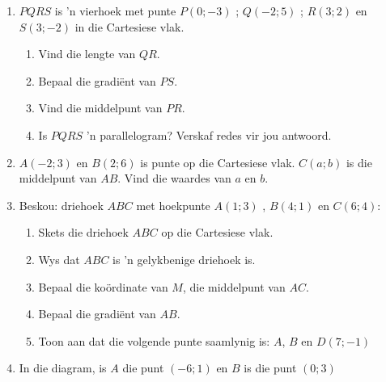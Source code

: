 \begin{eocexercises}{}
\begin{enumerate}[noitemsep, label=\textbf{\arabic*}. ]
\item $PQRS$ is ’n vierhoek met punte $P(0;-3)$ ; $Q(-2;5)$ ; $R(3;2)$ en $S(3;-2)$  in die Cartesiese vlak.
\begin{enumerate}[noitemsep, label=\textbf{(\alph*)} ]
\item Vind die lengte van $QR$.
\item Bepaal die gradiënt van $PS$.
\item Vind die middelpunt van $PR$.
\item Is $PQRS$  ’n parallelogram? Verskaf redes vir jou antwoord.
 \end{enumerate}
\item $A(-2;3)$ en $B(2;6)$ is punte op die Cartesiese vlak. $C(a;b)$ is die middelpunt van $AB$. Vind die waardes
van $a$ en $b$.
\item Beskou: driehoek $ABC$ met hoekpunte $A(1; 3)$ , $B(4;1)$ en $C (6; 4)$:
\begin{enumerate}[noitemsep, label=\textbf{(\alph*)} ]
\item Skets die driehoek $ABC$ op die Cartesiese vlak. 
\item Wys dat $ABC$ is ’n gelykbenige driehoek is.
\item Bepaal die koördinate van $M$, die middelpunt van $AC$.
\item Bepaal die gradiënt van $AB$.
\item Toon aan dat die volgende punte saamlynig is: $A$, $B$ en $D(7;-1)$
\end{enumerate}
\item In die diagram, is $A$ die punt $(-6;1)$ en $B$ is die punt $(0;3)$
    \setcounter{subfigure}{0}
    \begin{figure}[H] %
      \begin{center}
\end{center}
\end{figure}
\end{enumerate}
\end{eocexercises}
